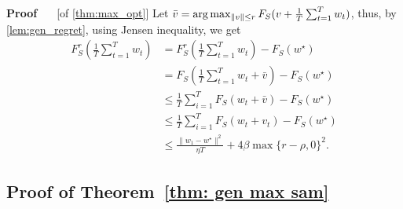 \documentclass[11pt]{article}
\newcommand{\fsmax}{F_S^{\rad}}
\newcommand{\rad}{r}
\renewenvironment{proof}[1][]{%
  \par\noindent\textbf{\upshape Proof%
  \if\relax\detokenize{#1}\relax\else\ #1\fi}\ %
}{\jmlrQED}
\begin{document}
\begin{proof} [of \cref{thm:max_opt}]
Let $\Bar{v}=\arg\max_{\|v\|\leq \rad} F_S(v+\frac{1}{T}\sum_{t=1}^T w_t)$, thus, by \cref{lem:gen_regret}, using Jensen inequality, we get
\begin{align*}
 \fsmax\left(\frac{1}{T}\sum_{t=1}^T w_t\right)
     &=\fsmax\left(\frac{1}{T}\sum_{t=1}^T w_t\right)-F_S(w^\star)
    \\&=F_S\left(\frac{1}{T}\sum_{t=1}^T w_t+\bar{v}\right)-F_S(w^\star)
    \\&\leq
    \frac{1}{T}\sum_{i=1}^T F_S\left( w_t+\bar{v}\right)-F_S(w^\star)
    \\&\leq
    \frac{1}{T}\sum_{i=1}^T F_S\left( w_t+v_t\right)-F_S(w^\star)
    \\&\leq 
    \frac{\|w_1-w^\star\|^2}{\eta T} + 4\beta\max\{\rad - \rho, 0\}^2.
\end{align*}
\end{proof}



\subsection{Proof of Theorem~\ref{thm: gen max sam}}\label{sec:proof_gen_max_sam}
\end{document}

